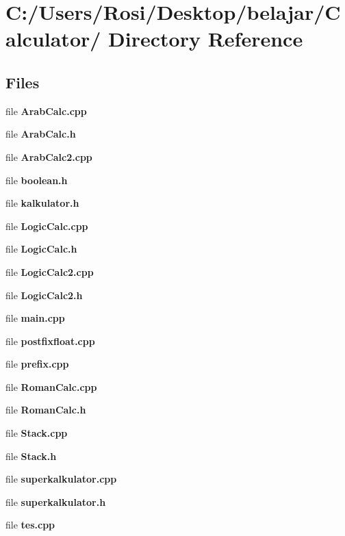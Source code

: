 \section{C:/Users/Rosi/Desktop/belajar/Calculator/ Directory Reference}
\label{dir_C_3A_2FUsers_2FRosi_2FDesktop_2Fbelajar_2FCalculator_2F}


\subsection*{Files}
\begin{CompactItemize}
\item 
file {\bf Arab\-Calc.cpp}
\item 
file {\bf Arab\-Calc.h}
\item 
file {\bf Arab\-Calc2.cpp}
\item 
file {\bf boolean.h}
\item 
file {\bf kalkulator.h}
\item 
file {\bf Logic\-Calc.cpp}
\item 
file {\bf Logic\-Calc.h}
\item 
file {\bf Logic\-Calc2.cpp}
\item 
file {\bf Logic\-Calc2.h}
\item 
file {\bf main.cpp}
\item 
file {\bf postfixfloat.cpp}
\item 
file {\bf prefix.cpp}
\item 
file {\bf Roman\-Calc.cpp}
\item 
file {\bf Roman\-Calc.h}
\item 
file {\bf Stack.cpp}
\item 
file {\bf Stack.h}
\item 
file {\bf superkalkulator.cpp}
\item 
file {\bf superkalkulator.h}
\item 
file {\bf tes.cpp}
\end{CompactItemize}
